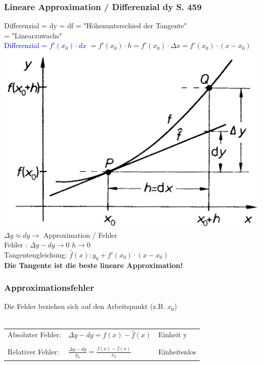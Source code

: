 			\subsubsection{Lineare Approximation / Differenzial dy S. 459}
			Differenzial = dy = df = "Höhenunterschied der Tangente" \\
			= "Linearzuwachs" \\
			\textcolor{blue}{Differenzial = $f'(x_0) \cdot dx$} $= f'(x_0) \cdot h = f'(x_0) \cdot \Delta x = f'(x_0) \cdot (x- x_0) $ \\
			\includegraphics[width=0.8\linewidth]{Bilder/differenzial}  \\
			$\Delta y \approx dy \rightarrow$ Approximation / Fehler \\
			Fehler : \quad $\Delta y - dy \rightarrow 0$ \quad $h \rightarrow 0$ \\	
			Tangentengleichung: $\hat f(x): y_0 + f'(x_0) \cdot (x - x_0)$ \\
			\textbf{Die Tangente ist die beste lineare Approximation!}		
			
			
			\subsubsection{Approximationsfehler}
			Die Fehler beziehen sich auf den Arbeitspunkt (z.B. $x_0$) \\
			\\
			\begin{tabular}{lll}
			Absoluter Fehler: & $\Delta y - dy = f(x) - \hat f(x)$ & Einheit y \\
			\\
			Relativer Fehler: & $\frac{\Delta y - dy}{y_0} = \frac{f(x) - \hat f(x)}{x_0} $ & Einheitenlos \\
			\end{tabular}
			
